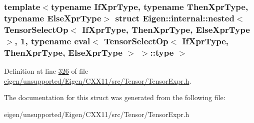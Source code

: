 \subsubsection*{template$<$typename If\+Xpr\+Type, typename Then\+Xpr\+Type, typename Else\+Xpr\+Type$>$\newline
struct Eigen\+::internal\+::nested$<$ Tensor\+Select\+Op$<$ If\+Xpr\+Type, Then\+Xpr\+Type, Else\+Xpr\+Type $>$, 1, typename eval$<$ Tensor\+Select\+Op$<$ If\+Xpr\+Type, Then\+Xpr\+Type, Else\+Xpr\+Type $>$ $>$\+::type $>$}



Definition at line \hyperlink{eigen_2unsupported_2_eigen_2_c_x_x11_2src_2_tensor_2_tensor_expr_8h_source_l00326}{326} of file \hyperlink{eigen_2unsupported_2_eigen_2_c_x_x11_2src_2_tensor_2_tensor_expr_8h_source}{eigen/unsupported/\+Eigen/\+C\+X\+X11/src/\+Tensor/\+Tensor\+Expr.\+h}.



The documentation for this struct was generated from the following file\+:\begin{DoxyCompactItemize}
\item 
eigen/unsupported/\+Eigen/\+C\+X\+X11/src/\+Tensor/\+Tensor\+Expr.\+h\end{DoxyCompactItemize}
